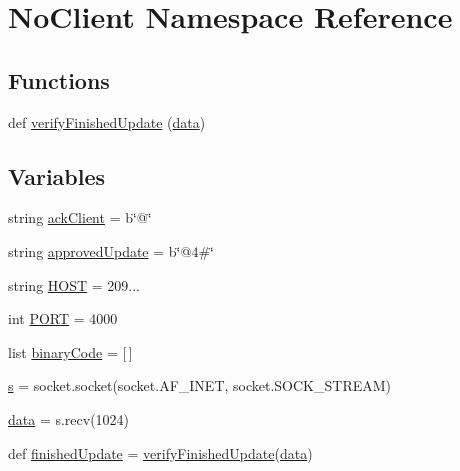\hypertarget{namespaceNoClient}{}\section{No\+Client Namespace Reference}
\label{namespaceNoClient}
\subsection*{Functions}
\begin{DoxyCompactItemize}
\item 
def \hyperlink{namespaceNoClient_ac97f6af869f1514eb8ce4f1b205c2bd5}{verify\+Finished\+Update} (\hyperlink{namespaceNoClient_a3687413639bcde5799ea49121c61206d}{data})
\end{DoxyCompactItemize}
\subsection*{Variables}
\begin{DoxyCompactItemize}
\item 
string \hyperlink{namespaceNoClient_afa59067c297f089b96e52a26cbe65e35}{ack\+Client} = b\char`\"{}@\char`\"{}
\item 
string \hyperlink{namespaceNoClient_a8a8f39cca298d07544827e3e590155f4}{approved\+Update} = b\char`\"{}@4\#\char`\"{}
\item 
string \hyperlink{namespaceNoClient_a6f89bd992508c504035304f4773518d3}{H\+O\+ST} = \textquotesingle{}209...\textquotesingle{}
\item 
int \hyperlink{namespaceNoClient_abb61c9ed514d4ed04b9689a37b40ee80}{P\+O\+RT} = 4000
\item 
list \hyperlink{namespaceNoClient_a40004afa65328c18891bec9feca29dad}{binary\+Code} = \mbox{[}$\,$\mbox{]}
\item 
\hyperlink{namespaceNoClient_a07aafa72fabaac63d60eb7397828e128}{s} = socket.\+socket(socket.\+A\+F\+\_\+\+I\+N\+ET, socket.\+S\+O\+C\+K\+\_\+\+S\+T\+R\+E\+AM)
\item 
\hyperlink{namespaceNoClient_a3687413639bcde5799ea49121c61206d}{data} = s.\+recv(1024)
\item 
def \hyperlink{namespaceNoClient_a408c6aa37feaeb4ce526cb6af66bdda2}{finished\+Update} = \hyperlink{namespaceNoClient_ac97f6af869f1514eb8ce4f1b205c2bd5}{verify\+Finished\+Update}(\hyperlink{namespaceNoClient_a3687413639bcde5799ea49121c61206d}{data})
\end{DoxyCompactItemize}


